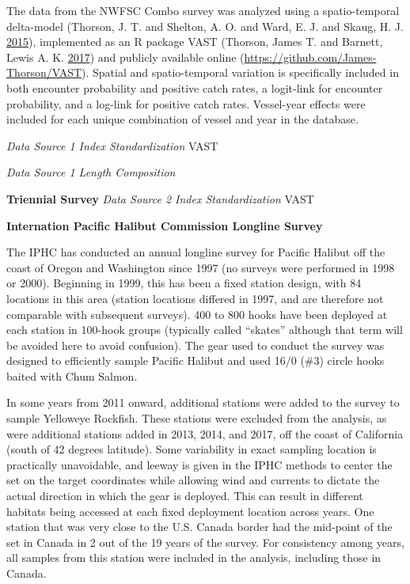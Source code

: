 \documentclass[12pt,]{article}
\begin{document}
The data from the NWFSC Combo survey was analyzed using a
spatio-temporal delta-model (Thorson, J. T. and Shelton, A. O. and Ward,
E. J. and Skaug, H. J. \protect\hyperlink{ref-Thorson2015}{2015}),
implemented as an R package VAST (Thorson, James T. and Barnett, Lewis
A. K. \protect\hyperlink{ref-Thorson2017a}{2017}) and publicly available
online (\url{https://github.com/James-Thorson/VAST}). Spatial and
spatio-temporal variation is specifically included in both encounter
probability and positive catch rates, a logit-link for encounter
probability, and a log-link for positive catch rates. Vessel-year
effects were included for each unique combination of vessel and year in
the database.

\emph{Data Source 1 Index Standardization} VAST

\emph{Data Source 1 Length Composition}

\textbf{Triennial Survey} \emph{Data Source 2 Index Standardization}
VAST

\textbf{Internation Pacific Halibut Commission Longline Survey}

The IPHC has conducted an annual longline survey for Pacific Halibut off
the coast of Oregon and Washington since 1997 (no surveys were performed
in 1998 or 2000). Beginning in 1999, this has been a fixed station
design, with 84 locations in this area (station locations differed in
1997, and are therefore not comparable with subsequent surveys). 400 to
800 hooks have been deployed at each station in 100-hook groups
(typically called ``skates'' although that term will be avoided here to
avoid confusion). The gear used to conduct the survey was designed to
efficiently sample Pacific Halibut and used 16/0 (\#3) circle hooks
baited with Chum Salmon.

In some years from 2011 onward, additional stations were added to the
survey to sample Yelloweye Rockfish. These stations were excluded from
the analysis, as were additional stations added in 2013, 2014, and 2017,
off the coast of California (south of 42 degrees latitude). Some
variability in exact sampling location is practically unavoidable, and
leeway is given in the IPHC methods to center the set on the target
coordinates while allowing wind and currents to dictate the actual
direction in which the gear is deployed. This can result in different
habitats being accessed at each fixed deployment location across years.
One station that was very close to the U.S. Canada border had the
mid-point of the set in Canada in 2 out of the 19 years of the survey.
For consistency among years, all samples from this station were included
in the analysis, including those in Canada.
\end{document}
